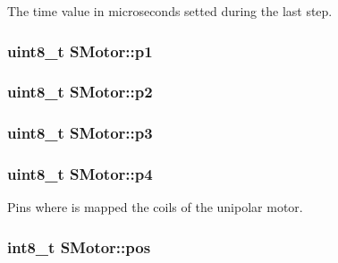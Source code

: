 The time value in microseconds setted during the last step. 

\hypertarget{class_s_motor_a2c60b5c8fe692572070fdc95c6b4b51e}{
\subsubsection[{p1}]{\setlength{\rightskip}{0pt plus 5cm}uint8\+\_\+t S\+Motor\+::p1\hspace{0.3cm}{\ttfamily [private]}}}\label{class_s_motor_a2c60b5c8fe692572070fdc95c6b4b51e}
\hypertarget{class_s_motor_a305bd59966c6596b977c2897cf6f3ee1}{
\subsubsection[{p2}]{\setlength{\rightskip}{0pt plus 5cm}uint8\+\_\+t S\+Motor\+::p2\hspace{0.3cm}{\ttfamily [private]}}}\label{class_s_motor_a305bd59966c6596b977c2897cf6f3ee1}
\hypertarget{class_s_motor_a2ed385362a1d5701bb4f1a922838c986}{
\subsubsection[{p3}]{\setlength{\rightskip}{0pt plus 5cm}uint8\+\_\+t S\+Motor\+::p3\hspace{0.3cm}{\ttfamily [private]}}}\label{class_s_motor_a2ed385362a1d5701bb4f1a922838c986}
\hypertarget{class_s_motor_a9eeaaa8a47f74a6f2972650afa76d02f}{
\subsubsection[{p4}]{\setlength{\rightskip}{0pt plus 5cm}uint8\+\_\+t S\+Motor\+::p4\hspace{0.3cm}{\ttfamily [private]}}}\label{class_s_motor_a9eeaaa8a47f74a6f2972650afa76d02f}


Pins where is mapped the coils of the unipolar motor. 

\hypertarget{class_s_motor_a994ea15ba154ccf166cdfefebae493bd}{
\subsubsection[{pos}]{\setlength{\rightskip}{0pt plus 5cm}int8\+\_\+t S\+Motor\+::pos\hspace{0.3cm}{\ttfamily [private]}}}\label{class_s_motor_a994ea15ba154ccf166cdfefebae493bd}


